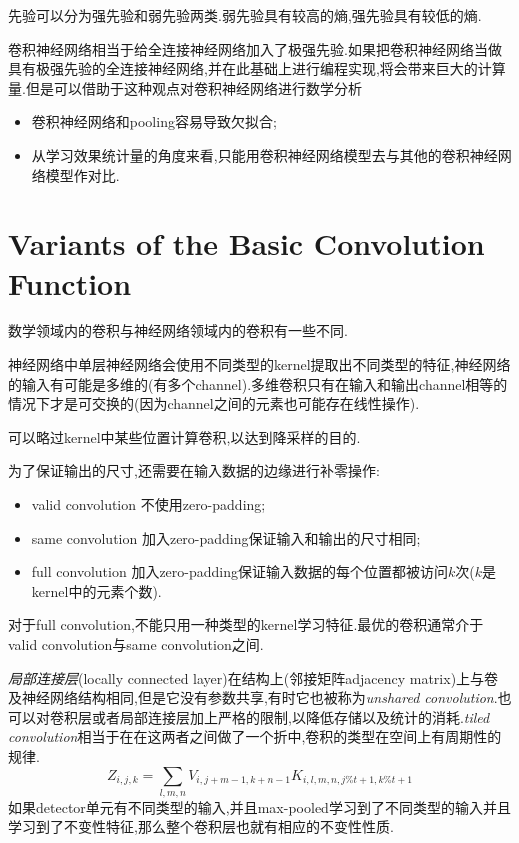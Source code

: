 先验可以分为强先验和弱先验两类.弱先验具有较高的熵,强先验具有较低的熵.

卷积神经网络相当于给全连接神经网络加入了极强先验.如果把卷积神经网络当做具有极强先验的全连接神经网络,并在此基础上进行编程实现,将会带来巨大的计算量.但是可以借助于这种观点对卷积神经网络进行数学分析
\begin{itemize}
    \item 卷积神经网络和pooling容易导致欠拟合;
    \item 从学习效果统计量的角度来看,只能用卷积神经网络模型去与其他的卷积神经网络模型作对比.
\end{itemize}

\section{Variants of the Basic Convolution Function}

数学领域内的卷积与神经网络领域内的卷积有一些不同.

神经网络中单层神经网络会使用不同类型的kernel提取出不同类型的特征,神经网络的输入有可能是多维的(有多个channel).多维卷积只有在输入和输出channel相等的情况下才是可交换的(因为channel之间的元素也可能存在线性操作).

可以略过kernel中某些位置计算卷积,以达到降采样的目的.

为了保证输出的尺寸,还需要在输入数据的边缘进行补零操作:
\begin{itemize}
    \item valid convolution 不使用zero-padding;
    \item same convolution 加入zero-padding保证输入和输出的尺寸相同;
    \item full convolution 加入zero-padding保证输入数据的每个位置都被访问$k$次($k$是kernel中的元素个数).
\end{itemize}
对于full convolution,不能只用一种类型的kernel学习特征.最优的卷积通常介于valid convolution与same convolution之间.

\textit{局部连接层}(locally connected layer)在结构上(邻接矩阵adjacency matrix)上与卷及神经网络结构相同,但是它没有参数共享,有时它也被称为\textit{unshared convolution}.也可以对卷积层或者局部连接层加上严格的限制,以降低存储以及统计的消耗.\textit{tiled convolution}相当于在在这两者之间做了一个折中,卷积的类型在空间上有周期性的规律.
\begin{equation}
Z_{i,j,k}=\sum_{l,m,n}V_{i,j+m-1,k+n-1}K_{i,l,m,n,j\%t+1,k\%t+1}
\end{equation}
如果detector单元有不同类型的输入,并且max-pooled学习到了不同类型的输入并且学习到了不变性特征,那么整个卷积层也就有相应的不变性性质.

